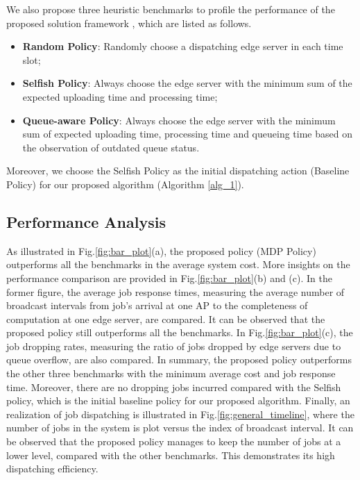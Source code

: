 We also propose {three heuristic benchmarks to profile the performance of the proposed solution framework \algname}, which are listed as follows.
\begin{itemize}
    \item \textbf{Random Policy}:
            Randomly choose a dispatching edge server in each time slot; 
    \item \textbf{Selfish Policy}:
            Always choose the edge server with the minimum sum of the expected uploading time and processing time;
    \item \textbf{Queue-aware Policy}:
            Always choose the edge server with the minimum sum of expected uploading time, processing time and queueing time based on the observation of outdated queue status.
\end{itemize}
Moreover, we choose the Selfish Policy as the initial dispatching action (Baseline Policy) for our proposed algorithm (Algorithm \ref{alg_1}).

\subsection{Performance Analysis}
\label{subsec:basic}
As illustrated in Fig.\ref{fig:bar_plot}(a), the proposed policy (MDP Policy) outperforms all the benchmarks in the average system cost.
More insights on the performance comparison are provided in Fig.\ref{fig:bar_plot}(b) and (c).
In the former figure, the average job response times, measuring the average number of broadcast intervals from job's arrival at one AP to the completeness of computation at one edge server, are compared.
It can be observed that the proposed policy still outperforms all the benchmarks.
In Fig.\ref{fig:bar_plot}(c), the job dropping rates, measuring the ratio of jobs dropped by edge servers due to queue overflow, are also compared.
{In} summary, the proposed policy outperforms {the} other three benchmarks with the minimum average cost and job response time.
{Moreover, there {are} no dropping jobs incurred compared with the Selfish policy, which is the initial baseline policy for our proposed algorithm.}
Finally, an realization of job dispatching is illustrated in Fig.\ref{fig:general_timeline}, where the number of jobs in the system is plot versus the index of broadcast interval.
It can be observed that the proposed policy {manages} to keep the number of jobs {at a} lower level, compared with the other benchmarks.
This demonstrates its high dispatching efficiency.


